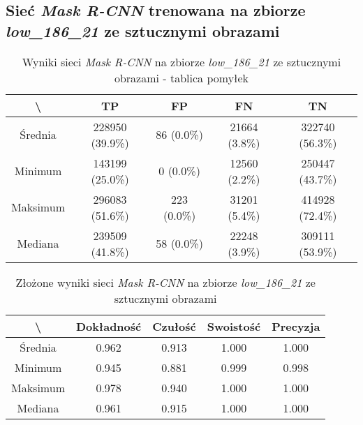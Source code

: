 \subsection{Sieć \textit{Mask R-CNN} trenowana na zbiorze \textit{low\_186\_21} ze sztucznymi obrazami}
\lowprocent

\begin{table}[H]
	\centering
	\caption{Wyniki sieci \textit{Mask R-CNN} na zbiorze \textit{low\_186\_21} ze sztucznymi obrazami - tablica pomyłek}
	\vspace{6pt}
	{\footnotesize
		\begin{tabular}{|c|c|c|c|c|}
      \hline \textbackslash & TP & FP & FN & TN \\
      \hline Średnia & 228950 (39.9\%) & 86 (0.0\%) & 21664 (3.8\%) & 322740 (56.3\%) \\
      \hline Minimum & 143199 (25.0\%) & 0 (0.0\%) & 12560 (2.2\%) & 250447 (43.7\%) \\
      \hline Maksimum & 296083 (51.6\%) & 223 (0.0\%) & 31201 (5.4\%) & 414928 (72.4\%) \\
      \hline Mediana & 239509 (41.8\%) & 58 (0.0\%) & 22248 (3.9\%) & 309111 (53.9\%) \\
      \hline
		\end{tabular}
	}
  \vspace{0pt}
  \label{Tab:low_original_generated}
\end{table}


\begin{table}[H]
	\centering
	\caption{Złożone wyniki sieci \textit{Mask R-CNN} na zbiorze \textit{low\_186\_21} ze sztucznymi obrazami}
	\vspace{6pt}
	{\footnotesize
		\begin{tabular}{|c|c|c|c|c|}
      \hline \textbackslash & Dokładność & Czułość & Swoistość & Precyzja \\
      \hline Średnia & 0.962 & 0.913 & 1.000 & 1.000 \\
      \hline Minimum & 0.945 & 0.881 & 0.999 & 0.998 \\
      \hline Maksimum & 0.978 & 0.940 & 1.000 & 1.000 \\
      \hline Mediana & 0.961 & 0.915 & 1.000 & 1.000 \\
      \hline
		\end{tabular}
	}
  \vspace{0pt}
  \label{Tab:low_original_generated_calculated}
\end{table}

